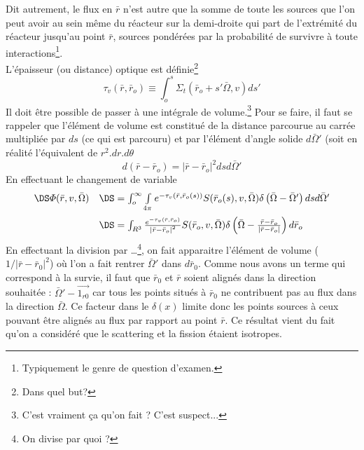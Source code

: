 Dit autrement, le flux en $\bar r$ n'est autre que la somme de toute les sources que l'on peut 
avoir au sein même du réacteur sur la demi-droite qui part de l'extrémité du réacteur jusqu'au point $\bar r$, sources pondérées par la probabilité de survivre à toute interactions\footnote{Typiquement le genre de question d'examen.}.\\

L'épaisseur (ou distance) optique est définie\footnote{Dans quel but?}
\begin{equation}
{\tau _v}(\bar r,{\bar r_o}) \equiv \int_o^s   {\Sigma _t}({\bar r_o} + s'\bar \Omega ,v)ds'
\end{equation}
Il doit être possible de passer à une intégrale de volume.\footnote{C'est vraiment ça qu'on fait ? C'est suspect...}
Pour se faire, il faut se rappeler que 
l'élément de volume est constitué de la distance parcourue au carrée multipliée par $ds$ (ce qui 
est parcouru) et par l'élément d'angle solide $d\bar\Omega'$ (soit en réalité l'équivalent de $r^2.dr.d\theta$
\begin{equation}
d(\bar r - {\bar r_o}) = {\left| {\bar r - {{\bar r}_o}} \right|^2}dsd\bar \Omega '
\end{equation}
En effectuant le changement de variable
\begin{equation}
\begin{array}{ll}
\DS\varPhi (\bar r,v,\bar \Omega ) &\DS= \int_o^\infty  {  \int\limits_{4\pi }    {e^{ - {\tau _v}(\bar r,{{\bar r}_o}(s))}}} S({\bar r_o}(s),v,\bar \Omega )\delta \left( {\bar \Omega  - \bar \Omega '} \right)dsd\bar \Omega '\vspace{2mm}\\
&\DS= \int_{{R^3}}^{} {  \frac{{{e^{ - {\tau _v}(\bar r,{{\bar r}_o})}}}}{{{{\left| {\bar r - {{\bar r}_o}} \right|}^2}}}} S({\bar r_o},v,\bar \Omega )\delta \left( {\bar \Omega  - \frac{{\bar r - {{\bar r}_o}}}{{\left| {\bar r - {{\bar r}_o}} \right|}}} \right)d{\bar r_o}
\end{array}
\end{equation}
En effectuant la division par \dots\footnote{On divise par quoi ?}, on fait apparaitre l'élément de volume ($1/|\bar r -\bar r_0
|^2$) où l'on a fait rentrer $\bar\Omega'$ dans $d\bar r_0$. Comme nous avons  un terme qui 
correspond à la survie, il faut que $\bar r_0$ et $\bar r$ soient alignés dans la direction 
souhaitée : $\bar\Omega'-\vec{1_{r0}}$ car tous les points situés à $\bar r_0$ ne contribuent pas
au flux dans la direction $\bar\Omega$. Ce facteur dans le $\delta(x)$ limite donc les points sources
à ceux pouvant être alignés au flux par rapport au point $\bar r$. Ce résultat vient du fait
qu'on a considéré que le scattering et la fission étaient isotropes.\\


